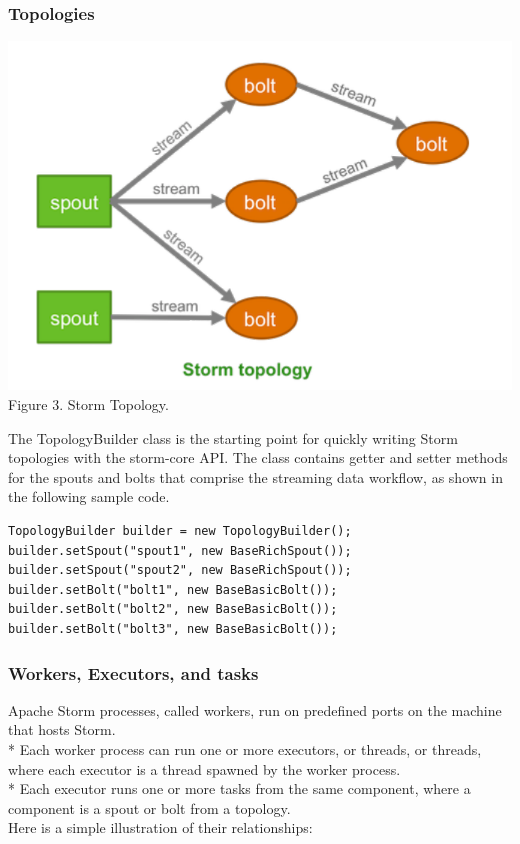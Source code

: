 \documentclass{hcmutarticle}
\begin{document}
\subsubsection{Topologies\\}
\begin{center}
\includegraphics[scale=0.3]{image/topologyPNG.PNG}\\[0.5cm]
Figure 3. Storm Topology.
\end{center}

The TopologyBuilder class is the starting point for quickly writing Storm topologies
with the storm-core API. The class contains getter and setter methods for the spouts and
bolts that comprise the streaming data workflow, as shown in the following sample code.

\begin{lstlisting}
TopologyBuilder builder = new TopologyBuilder();
builder.setSpout("spout1", new BaseRichSpout());
builder.setSpout("spout2", new BaseRichSpout());
builder.setBolt("bolt1", new BaseBasicBolt());
builder.setBolt("bolt2", new BaseBasicBolt());
builder.setBolt("bolt3", new BaseBasicBolt());
\end{lstlisting}
\subsubsection{Workers, Executors, and tasks\\}
Apache Storm processes, called workers, run on predefined ports on the machine that hosts Storm.\\
* Each worker process can run one or more executors, or threads, or threads, where each executor is a thread spawned by the worker process.\\
* Each executor runs one or more tasks from the same component, where a component is a spout or bolt from a topology.\\
Here is a simple illustration of their relationships:\\
\end{document}
